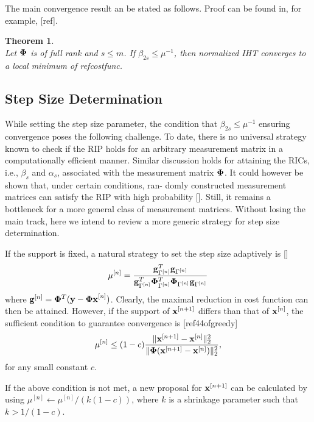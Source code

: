 \documentclass{article}
\newtheorem{theorem}{Theorem}
\begin{document}
The main convergence result an be stated as follows. Proof can be found in, for example, [ref].

\begin{theorem}
{\rm{\cite{niht}}}\\ 
Let ${\bf \Phi}$ is of full rank and $s\leq m$. If $\beta_{2s}\leq\mu^{-1}$, then normalized IHT converges to a local minimum of ref{costfunc}.
\end{theorem}

\subsection{Step Size Determination} 
While setting the step size parameter, the condition that $\beta_{2s}\leq\mu^{-1}$ ensuring convergence poses the following challenge. To date, there is no universal strategy known to check if the RIP holds for an arbitrary measurement matrix in a computationally efficient manner. Similar discussion holds for attaining the RICs, i.e., ${\beta_s}$ and $\alpha_s$, associated with the measurement matrix ${\bf \Phi}$. It could however be shown that, under certain conditions, ran-
domly constructed measurement matrices can satisfy
the RIP with high probability []. Still, it remains a bottleneck for a more general class of
measurement matrices. Without losing the main track, here we intend to review a more generic strategy for step size determination.

If the support is fixed, a natural strategy to set the step size adaptively is []
\begin{equation}\label{step_size}
   \mu^{[n]} = \frac{{\bf g}^T_{\Gamma^{[n]}}{\bf g}_{\Gamma^{[n]}}}{{\bf g}^T_{\Gamma^{[n]}}{\bf \Phi}^T_{\Gamma^{[n]}}{\bf \Phi}_{\Gamma^{[n]}}{\bf g}_{\Gamma^{[n]}}}
\end{equation}
where ${\bf g}^{[n]} = {\bf \Phi}^T({\bf y}-{\bf \Phi x}^{[n]})$. Clearly, the maximal reduction in cost function can then be attained. However, if the support of ${\bf x}^{[n+1]}$ differs than that of ${\bf x}^{[n]}$, the sufficient condition to guarantee convergence is [ref44ofgreedy]
\begin{equation}
    \mu^{[n]} \leq(1-c) \frac{\|{\bf x}^{[n+1]}-{\bf x}^{[n]} \|_2^2}{\|{\bf \Phi}({\bf x}^{[n+1]}-{\bf x}^{[n]}) \|_2^2},
\end{equation}
for any small constant $c$.

If the above condition is not met, a new proposal for ${\bf x}^{[n+1]}$ can be calculated by using $\mu^{[n]}\leftarrow{\mu^{[n]}/(k(1-c))}$, where $k$ is a shrinkage parameter such that $k>1/(1-c)$.
\end{document}
